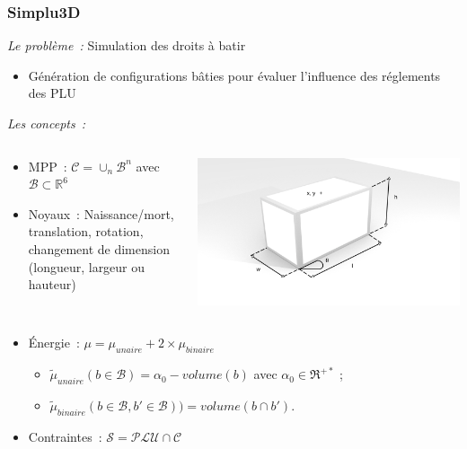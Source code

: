 \documentclass{beamer}
\begin{document}
\begin{frame}
\frametitle{Simplu3D}
\emph{Le probl\`eme~:}  Simulation des droits \`a batir
\begin{itemize}
\item Génération de configurations bâties pour évaluer l'influence des réglements des PLU
\end{itemize}
\emph{Les concepts~:}
\begin{columns}
\begin{column}{0.55\textwidth}
\begin{itemize}
\item MPP~:  $ \mathcal{C} =\cup_{n} \mathcal{B}^n$  avec $\mathcal{B}  \subset  \mathds{R}^{6}$
\item Noyaux~: Naissance/mort, translation, rotation, changement de dimension (longueur, largeur ou hauteur)
\end{itemize}
\end{column}
\begin{column}{0.45\textwidth}
 \includegraphics[width=\textwidth]{boiteFin.png}
\end{column}
\end{columns}
\begin{itemize}
\item Énergie~: $\mu = \mu_{unaire} + 2 \times \mu_{binaire}$
\begin{itemize}
\item $\tilde \mu_{unaire}(b \in \mathcal{B})=\alpha_{0} - volume(b)$ avec $\alpha_{0} \in \Re^{+*}$ ;
\item $\tilde \mu_{binaire}(b \in \mathcal{B}, b' \in \mathcal{B})) = volume(b \cap b')$.
\end{itemize}
\item Contraintes~:  $ \mathcal{S} = \mathcal{PLU} \cap  \mathcal{C}   $
\end{itemize}


\end{frame}
\end{document}
